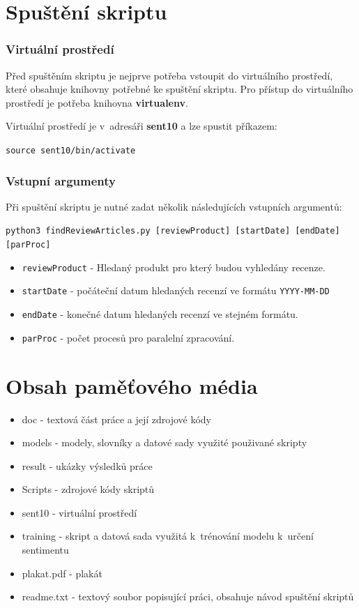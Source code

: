 \chapter{Spuštění skriptu}
\subsection*{Virtuální prostředí}
Před spuštěním skriptu je nejprve potřeba vstoupit do virtuálního prostředí, které obsahuje knihovny potřebné ke spuštění skriptu. Pro přístup do virtuálního prostředí je potřeba knihovna \textbf{virtualenv}.

Virtuální prostředí je v~adresáři \textbf{sent10} a lze spustit příkazem:
\begin{center}
    \verb|source sent10/bin/activate|
\end{center}

\subsection*{Vstupní argumenty}
Při spuštění skriptu je nutné zadat několik následujících vstupních argumentů:
\begin{center}
\small
\verb|python3 findReviewArticles.py [reviewProduct] [startDate] [endDate] [parProc]|
\end{center}
\begin{itemize}
    \item \verb|reviewProduct| - Hledaný produkt pro který budou vyhledány recenze.
    \item \verb|startDate| - počáteční datum hledaných recenzí ve formátu \verb|YYYY-MM-DD|
    \item \verb|endDate| - konečné datum hledaných recenzí ve stejném formátu.
    \item \verb|parProc| - počet procesů pro paralelní zpracování.
\end{itemize}

\chapter{Obsah paměťového média}

\begin{itemize}
    \item doc - textová část práce a její zdrojové kódy
    \item models - modely, slovníky a datové sady využité použivané skripty
    \item result - ukázky výsledků práce
    \item Scripts - zdrojové kódy skriptů
    \item sent10 - virtuální prostředí
    \item training - skript a datová sada využitá k~trénování modelu k~určení sentimentu
    \item plakat.pdf - plakát
    \item readme.txt - textový soubor popisující práci, obsahuje návod spuštění skriptů
\end{itemize}


